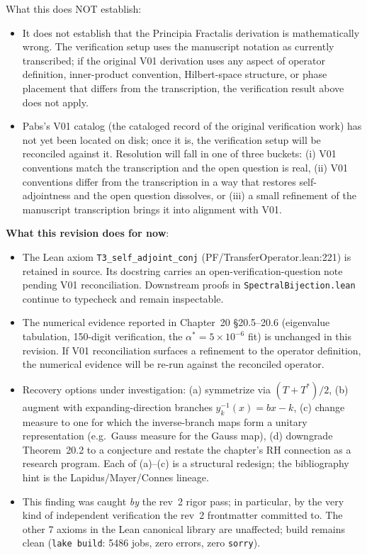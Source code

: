 What this does NOT establish:
\begin{itemize}
\item It does not establish that the Principia Fractalis derivation is
      mathematically wrong. The verification setup uses the manuscript
      notation as currently transcribed; if the original V01 derivation
      uses any aspect of operator definition, inner-product convention,
      Hilbert-space structure, or phase placement that differs from
      the transcription, the verification result above does not apply.
\item Pabs's V01 catalog (the cataloged record of the original
      verification work) has not yet been located on disk; once it is,
      the verification setup will be reconciled against it. Resolution
      will fall in one of three buckets: (i) V01 conventions match the
      transcription and the open question is real, (ii) V01 conventions
      differ from the transcription in a way that restores self-adjointness
      and the open question dissolves, or (iii) a small refinement of
      the manuscript transcription brings it into alignment with V01.
\end{itemize}

\textbf{What this revision does for now}:

\begin{itemize}
\item The Lean axiom \texttt{T3\_self\_adjoint\_conj} (PF/TransferOperator.lean:221)
      is retained in source. Its docstring carries an open-verification-question
      note pending V01 reconciliation. Downstream proofs in
      \texttt{SpectralBijection.lean} continue to typecheck and remain
      inspectable.
\item The numerical evidence reported in Chapter~20 \S20.5--20.6
      (eigenvalue tabulation, 150-digit verification, the
      $\alpha^* = 5 \times 10^{-6}$ fit) is unchanged in this revision.
      If V01 reconciliation surfaces a refinement to the operator
      definition, the numerical evidence will be re-run against the
      reconciled operator.
\item Recovery options under investigation: (a) symmetrize via
      $(T+T^*)/2$, (b) augment with expanding-direction branches
      $y_k^{-1}(x) = bx - k$, (c) change measure to one for which
      the inverse-branch maps form a unitary representation
      (e.g.\ Gauss measure for the Gauss map), (d) downgrade
      Theorem~20.2 to a conjecture and restate the chapter's
      RH connection as a research program. Each of (a)--(c) is a
      structural redesign; the bibliography hint is the
      Lapidus/Mayer/Connes lineage.
\item This finding was caught \emph{by} the rev~2 rigor pass; in
      particular, by the very kind of independent verification the
      rev~2 frontmatter committed to. The other 7 axioms in the
      Lean canonical library are unaffected; build remains clean
      (\texttt{lake build}: 5486 jobs, zero errors, zero
      \texttt{sorry}).
\end{itemize}


